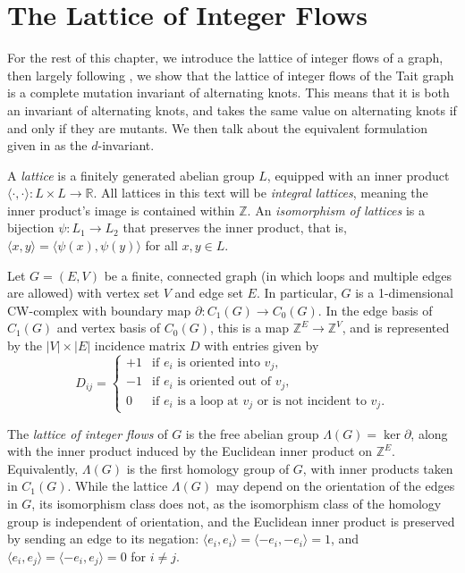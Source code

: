 \documentclass[12pt]{report}
\newcommand{\R}{\mathbb{R}}
\newcommand{\Z}{\mathbb{Z}}
\newcommand{\ip}[2]{\langle #1, #2 \rangle}
\begin{document}
\section{The Lattice of Integer Flows}

For the rest of this chapter, we introduce the lattice of integer flows of a graph, then largely following \cite{lattices-graphs-mutation}, we show that the lattice of integer flows of the Tait graph is a complete mutation invariant of alternating knots. This means that it is both an invariant of alternating knots, and takes the same value on alternating knots if and only if they are mutants. We then talk about the equivalent formulation given in \cite{lattices-graphs-mutation} as the $d$-invariant.

A \textit{lattice} is a finitely generated abelian group $L$, equipped with an inner product 
\({\ip{\cdot}{\cdot}: L \times L \longrightarrow \R}\). All lattices in this text will be \textit{integral lattices}, meaning the inner product's image is contained within $\Z$. An \textit{isomorphism of lattices} is a bijection $\psi: L_{1} \longrightarrow L_{2}$ that preserves the inner product, that is, ${\ip{x}{y} = \ip{\psi(x)}{\psi(y)}}$ for all $x, y \in L$.

Let $G = (E, V)$ be a finite, connected graph (in which loops and multiple edges are allowed) with vertex set $V$ and edge set $E$. In particular, $G$ is a 1-dimensional CW-complex with boundary map $\partial: C_{1}(G) \longrightarrow C_{0}(G)$. In the edge basis of $C_{1}(G)$ and vertex basis of $C_{0}(G)$, this is a map $\Z^{E} \longrightarrow \Z^{V}$, and is represented by the $|V|\times|E|$ incidence matrix $D$ with entries given by
\[D_{ij} = \begin{cases}
	+1 & \text{if $e_{i}$ is oriented into $v_{j}$,}   \\
	-1 & \text{if $e_{i}$ is oriented out of $v_{j}$,} \\
	0  & \text{if $e_{i}$ is a loop at $v_{j}$ or is not incident to $v_{j}$.}
\end{cases}\]

The \textit{lattice of integer flows} of $G$ is the free abelian group $\Lambda(G) = \ker \partial$, along with the inner product induced by the Euclidean inner product on $\Z^{E}$. Equivalently, $\Lambda(G)$ is the first homology group of $G$, with inner products taken in $C_{1}(G)$. While the lattice $\Lambda(G)$ may depend on the orientation of the edges in $G$, its isomorphism class does not, as the isomorphism class of the homology group is independent of orientation, and the Euclidean inner product is preserved by sending an edge to its negation: $\ip{e_{i}}{e_{i}} =  \ip{-e_{i}}{-e_{i}} = 1$, and $\ip{e_{i}}{e_{j}} = \ip{-e_{i}}{e_{j}} = 0$ for $i \neq j$.
\end{document}

